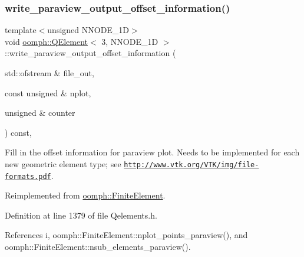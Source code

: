 \subsubsection{\texorpdfstring{write\+\_\+paraview\+\_\+output\+\_\+offset\+\_\+information()}{write\_paraview\_output\_offset\_information()}}
{\footnotesize\ttfamily template$<$unsigned N\+N\+O\+D\+E\+\_\+1D$>$ \\
void \hyperlink{classoomph_1_1QElement}{oomph\+::\+Q\+Element}$<$ 3, N\+N\+O\+D\+E\+\_\+1D $>$\+::write\+\_\+paraview\+\_\+output\+\_\+offset\+\_\+information (\begin{DoxyParamCaption}\item[{std\+::ofstream \&}]{file\+\_\+out,  }\item[{const unsigned \&}]{nplot,  }\item[{unsigned \&}]{counter }\end{DoxyParamCaption}) const\hspace{0.3cm}{\ttfamily [inline]}, {\ttfamily [virtual]}}



Fill in the offset information for paraview plot. Needs to be implemented for each new geometric element type; see \href{http://www.vtk.org/VTK/img/file-formats.pdf}{\tt http\+://www.\+vtk.\+org/\+V\+T\+K/img/file-\/formats.\+pdf}. 



Reimplemented from \hyperlink{classoomph_1_1FiniteElement_afed006dd5b9ab6bd613d8496e6048abf}{oomph\+::\+Finite\+Element}.



Definition at line 1379 of file Qelements.\+h.



References i, oomph\+::\+Finite\+Element\+::nplot\+\_\+points\+\_\+paraview(), and oomph\+::\+Finite\+Element\+::nsub\+\_\+elements\+\_\+paraview().

\mbox{\label{classoomph_1_1QElement_3_013_00_01NNODE__1D_01_4_ad7a02e0ff26ec1a2e757c54ba993cfb7}} 
